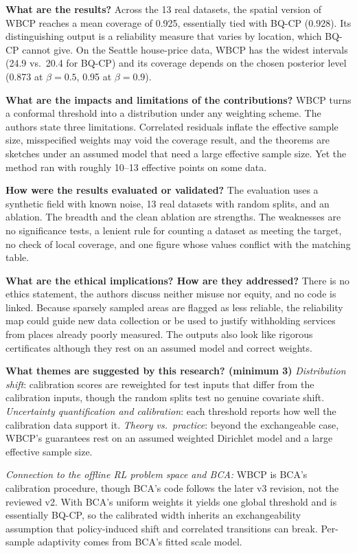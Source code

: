 \documentclass[11pt]{article}
\newcommand{\q}[2]{\item \textbf{#1} #2}
\newcommand{\tiein}[1]{\par\smallskip\noindent\emph{Connection to the offline RL problem space and BCA:} #1\par\medskip}
\begin{document}
\begin{qna}
\q{What are the results?}
Across the 13 real datasets, the spatial version of WBCP reaches a mean coverage of 0.925, essentially tied with BQ-CP (0.928). Its distinguishing output is a reliability measure that varies by location, which BQ-CP cannot give. On the Seattle house-price data, WBCP has the widest intervals (24.9 vs.\ 20.4 for BQ-CP) and its coverage depends on the chosen posterior level (0.873 at $\beta=0.5$, 0.95 at $\beta=0.9$).

\q{What are the impacts and limitations of the contributions?}
WBCP turns a conformal threshold into a distribution under any weighting scheme. The authors state three limitations. Correlated residuals inflate the effective sample size, misspecified weights may void the coverage result, and the theorems are sketches under an assumed model that need a large effective sample size. Yet the method ran with roughly 10--13 effective points on some data.

\q{How were the results evaluated or validated?}
The evaluation uses a synthetic field with known noise, 13 real datasets with random splits, and an ablation. The breadth and the clean ablation are strengths. The weaknesses are no significance tests, a lenient rule for counting a dataset as meeting the target, no check of local coverage, and one figure whose values conflict with the matching table.

\q{What are the ethical implications? How are they addressed?}
There is no ethics statement, the authors discuss neither misuse nor equity, and no code is linked. Because sparsely sampled areas are flagged as less reliable, the reliability map could guide new data collection or be used to justify withholding services from places already poorly measured. The outputs also look like rigorous certificates although they rest on an assumed model and correct weights.

\q{What themes are suggested by this research? (minimum 3)}
\emph{Distribution shift}: calibration scores are reweighted for test inputs that differ from the calibration inputs, though the random splits test no genuine covariate shift. \emph{Uncertainty quantification and calibration}: each threshold reports how well the calibration data support it. \emph{Theory vs.\ practice}: beyond the exchangeable case, WBCP's guarantees rest on an assumed weighted Dirichlet model and a large effective sample size.

\end{qna}
\tiein{WBCP is BCA's calibration procedure, though BCA's code follows the later v3 revision, not the reviewed v2. With BCA's uniform weights it yields one global threshold and is essentially BQ-CP, so the calibrated width inherits an exchangeability assumption that policy-induced shift and correlated transitions can break. Per-sample adaptivity comes from BCA's fitted scale model.}
\end{document}
